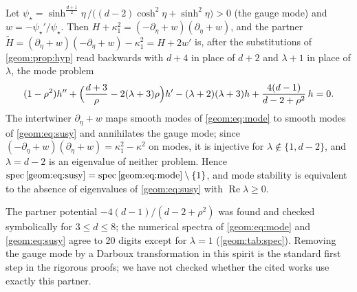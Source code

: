 \begin{proposition}\label{geom:prop:susy}
Let $\psi_\star=\sinh^{\frac{d+1}{2}}\eta\,/\bigl((d-2)\cosh^2\eta+\sinh^2\eta\bigr)>0$
(the gauge mode) and $w=-\psi_\star'/\psi_\star$. Then
$H+\kappa_1^2=(-\partial_\eta+w)(\partial_\eta+w)$, and the partner
$\widetilde H=(\partial_\eta+w)(-\partial_\eta+w)-\kappa_1^2=H+2w'$ is, after
the substitutions of \cref{geom:prop:hyp} read backwards with $d+4$ in place of
$d+2$ and $\lambda+1$ in place of $\lambda$, the mode problem
\begin{equation}\label{geom:eq:susy}
  (1-\rho^2)h''+\Bigl(\frac{d+3}{\rho}-2(\lambda+3)\rho\Bigr)h'
  -(\lambda+2)(\lambda+3)h+\frac{4(d-1)}{d-2+\rho^2}\,h=0 .
\end{equation}
The intertwiner $\partial_\eta+w$ maps smooth modes of \eqref{geom:eq:mode}
to smooth modes of \eqref{geom:eq:susy} and annihilates the gauge mode; since
$(-\partial_\eta+w)(\partial_\eta+w)=\kappa_1^2-\kappa^2$ on modes, it is
injective for $\lambda\notin\{1,d-2\}$, and $\lambda=d-2$ is an eigenvalue of
neither problem. Hence
$\operatorname{spec}\eqref{geom:eq:susy}=\operatorname{spec}\eqref{geom:eq:mode}\setminus\{1\}$,
and mode stability is equivalent to the absence of eigenvalues of
\eqref{geom:eq:susy} with $\operatorname{Re}\lambda\ge0$.
\end{proposition}
The partner potential $-4(d-1)/(d-2+\rho^2)$ was found and checked
symbolically for $3\le d\le8$; the numerical spectra of
\eqref{geom:eq:mode} and \eqref{geom:eq:susy} agree to 20 digits except for
$\lambda=1$ (\cref{geom:tab:spec}). Removing the gauge mode by a Darboux
transformation in this spirit is the standard first step in the rigorous
proofs; we have not checked whether the cited works use exactly this
partner.

